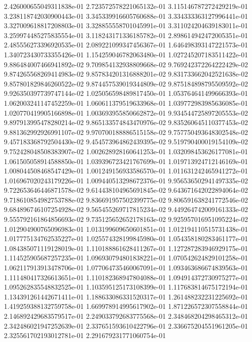 2.426000655049311838e-01
2.723572578221065132e-01
3.115146787272429219e-01
3.238118742030900443e-01
3.345339916605760688e-01
3.334333363127996441e-01
3.327009618817208803e-01
3.328855558701045991e-01
3.311024204639183011e-01
3.259974485275835554e-01
3.118243171336185782e-01
2.898614942472005351e-01
2.485556273396920535e-01
2.089221099347456367e-01
1.646498393147221573e-01
1.340723430733355426e-01
1.154259046782063480e-01
1.027245207183511422e-01
9.886484007466941892e-02
9.709854132938809668e-02
9.769242372264222429e-02
9.874265568269414983e-02
9.857834201316888201e-02
9.831733662042521638e-02
9.857801829846260522e-02
9.874457539019344809e-02
9.875184898795509592e-02
9.926350397739747144e-02
1.025056598489817450e-01
1.053764641499666393e-01
1.062003241147452259e-01
1.060611379519633968e-01
1.039772983985636085e-01
1.020770419905166898e-01
1.003693955850662872e-01
9.934544725897205553e-02
9.897913995478280214e-02
9.865133574843470976e-02
9.835260645110377453e-02
9.881362992926991107e-02
9.970700188886515158e-02
9.757750493648302548e-02
9.457183368792504430e-02
9.454573964862439395e-02
9.519790400019154109e-02
9.752428048508383907e-02
1.002628928160641253e-01
1.032098453626177081e-01
1.061505058914588850e-01
1.039396723421767699e-01
1.019713924712146169e-01
1.008044508468547429e-01
1.001249156933586570e-01
1.011631242465941272e-01
1.016967020243179226e-01
1.009440513298672376e-01
9.956536502941497335e-02
9.722653646446871578e-02
9.614438104965691845e-02
9.643671642022894064e-02
9.718610854982753788e-02
9.836691957502399775e-02
9.806591638241772546e-02
9.684896746107254928e-02
9.565455269717815234e-02
9.449264742009161333e-02
9.555792161864856693e-02
9.735125652652178163e-02
9.925957016951095224e-02
1.012904900765096983e-01
1.013199609650601851e-01
1.012194110515731438e-01
1.017775134762535227e-01
1.025574328199845980e-01
1.054358180283461177e-01
1.084385071119128019e-01
1.110188861628411267e-01
1.127287283946929175e-01
1.114525905687257235e-01
1.096930794801838221e-01
1.070542624829101258e-01
1.062117913913478706e-01
1.077064735460067091e-01
1.093463686674839563e-01
1.111480417326613651e-01
1.110182368947804088e-01
1.094914372730975277e-01
1.095262835548832525e-01
1.103595125173108399e-01
1.117683814675172194e-01
1.134391261442671411e-01
1.188633086331520317e-01
1.261488232231225692e-01
1.419259388132759758e-01
1.669978914995617902e-01
1.871226572307558844e-01
2.146892429683579517e-01
2.249033792683775568e-01
2.348468204298465312e-01
2.342486021947252639e-01
2.337651593610422796e-01
2.336675204551961205e-01
2.325561702193012781e-01
2.291679231771060754e-01
